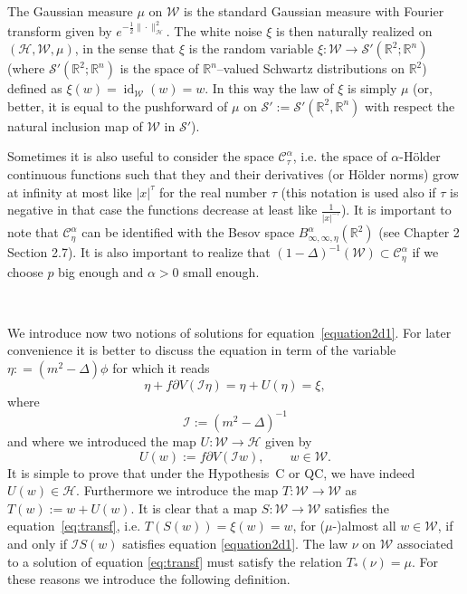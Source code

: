 \documentclass[a4paper,10pt]{article}
\newcommand{\assign}{:=}
\newcommand{\asterisk}{\mathord{*}}
\newcommand{\tmname}[1]{\textsc{#1}}
\newcommand{\tmop}[1]{\ensuremath{\operatorname{#1}}}
\begin{document}
The Gaussian measure $\mu$ on $\mathcal{W}$ is the standard Gaussian measure
with Fourier transform given by $e^{- \frac{1}{2} \| \cdot
\|^2_{\mathcal{H}}}$. The white noise $\xi$ is then naturally realized on
$(\mathcal{H}, \mathcal{W}, \mu)$, in the sense that $\xi$ is the random
variable $\xi : \mathcal{W} \rightarrow \mathcal{S}' (\mathbb{R}^2 ;
\mathbb{R}^n)$ (where $\mathcal{S}' (\mathbb{R}^2 ; \mathbb{R}^n)$ is the
space of $\mathbb{R}^n$--valued Schwartz distributions on $\mathbb{R}^2$)
defined as $\xi (w) = \tmop{id}_{\mathcal{W}} (w) = w$. In this way the law of
$\xi$ is simply $\mu$ (or, better, it is equal to the pushforward of $\mu$ on
$\mathcal{S}' \assign \mathcal{S}' (\mathbb{R}^2, \mathbb{R}^n)$ with respect
the natural inclusion map of $\mathcal{W}$ in $\mathcal{S}'$).

Sometimes it is also useful to consider the space
$\mathcal{C}^{\alpha}_{\tau}$, i.e. the space of
$\alpha$-H{\tmname{}}{\"o}lder continuous functions such that they and their
derivatives (or H{\"o}lder norms) grow at infinity at most like $| x |^{\tau}$
for the real number $\tau$ (this notation is used also if $\tau$ is negative
in that case the functions decrease at least like $\frac{1}{| x |^{- \tau}}$).
It is important to note that $\mathcal{C}^{\alpha}_{\eta}$ can be identified
with the Besov space $B^{\alpha}_{\infty, \infty, \eta} (\mathbb{R}^2)$ (see
{\cite{Bahouri2011}} Chapter 2 Section 2.7). It is also important to realize
that $(1 - \Delta)^{- 1} (\mathcal{W}) \subset \mathcal{C}^{\alpha}_{\eta}$ if
we choose $p$ big enough and $\alpha > 0$ small enough.

\

We introduce now two notions of solutions for equation~{\eqref{equation2d1}}.
For later convenience it is better to discuss the equation in term of the
variable $\eta : = (m^2 - \Delta) \phi$ for which it reads
\begin{equation}
  \eta + f \partial V (\mathcal{I} \eta) = \eta + U (\eta) = \xi,
  \label{eq:transf}
\end{equation}
where
\[ \mathcal{I} \assign (m^2 - \Delta)^{- 1} \]
and where we introduced the map $U : \mathcal{W} \rightarrow \mathcal{H}$
given by
\begin{equation}
  U (w) \assign f \partial V (\mathcal{I}w) \label{equationU}, \qquad w \in
  \mathcal{W}.
\end{equation}
It is simple to prove that under the Hypothesis~C or QC, we have indeed $U (w)
\in \mathcal{H}$. Furthermore we introduce the map $T : \mathcal{W}
\rightarrow \mathcal{W}$ as $T (w) \assign w + U (w)$. It is clear that a map
$S : \mathcal{W} \rightarrow \mathcal{W}$ satisfies the
equation~{\eqref{eq:transf}}, i.e. $T (S (w)) = \xi (w) = w$, for
($\mu$-)almost all $w \in \mathcal{W}$, if and only if $\mathcal{I}S (w)$
satisfies equation {\eqref{equation2d1}}. The law $\nu$ on $\mathcal{W}$
associated to a solution of equation {\eqref{eq:transf}} must satisfy the
relation $T_{\asterisk}^{} (\nu) = \mu$. For these reasons we introduce the
following definition.
\end{document}
